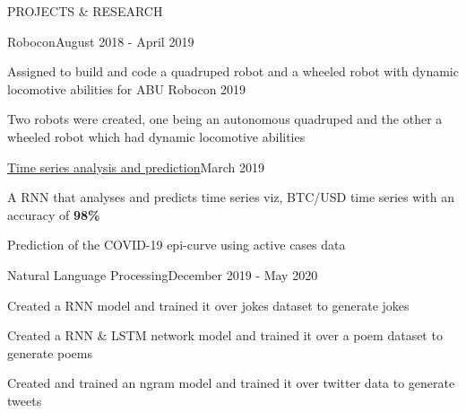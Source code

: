 \documentclass{resume} %
\begin{document}
\begin{rSection}{PROJECTS \& RESEARCH}
\begin{rSubsection}{Robocon}{August 2018 - April 2019}{}{}
\item Assigned to build and code a quadruped robot and a wheeled robot with dynamic locomotive abilities for ABU Robocon 2019
\item Two robots were created, one being an autonomous quadruped and the other a wheeled robot which had dynamic locomotive abilities
\end{rSubsection}

\begin{rSubsection}{\href{https://github.com/obi-wan-shinobi/BTC_predictor}{Time series analysis and prediction}}{March 2019}{}{}
\item A RNN that analyses and predicts time series viz, BTC/USD time series with an accuracy of \textbf{98\%}
\item Prediction of the COVID-19 epi-curve using active cases data
\end{rSubsection}

\begin{rSubsection}{Natural Language Processing}{December 2019 - May 2020}{}{}
\item Created a RNN model and trained it over jokes dataset to generate jokes
\item Created a RNN \& LSTM network model and trained it over a poem dataset to generate poems
\item Created and trained an ngram model and trained it over twitter data to generate tweets
\end{rSubsection}


\end{rSection}
\end{document}
